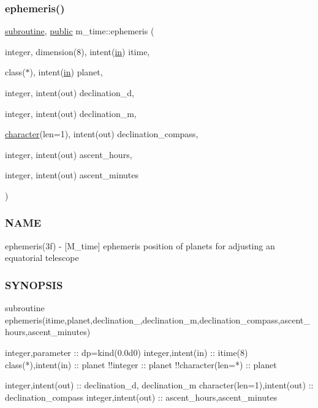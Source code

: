 \subsubsection{\texorpdfstring{ephemeris()}{ephemeris()}}
{\footnotesize\ttfamily \hyperlink{M__stopwatch_83_8txt_acfbcff50169d691ff02d4a123ed70482}{subroutine}, \hyperlink{M__stopwatch_83_8txt_a2f74811300c361e53b430611a7d1769f}{public} m\+\_\+time\+::ephemeris (\begin{DoxyParamCaption}\item[{integer, dimension(8), intent(\hyperlink{M__journal_83_8txt_afce72651d1eed785a2132bee863b2f38}{in})}]{itime,  }\item[{class($\ast$), intent(\hyperlink{M__journal_83_8txt_afce72651d1eed785a2132bee863b2f38}{in})}]{planet,  }\item[{integer, intent(out)}]{declination\+\_\+d,  }\item[{integer, intent(out)}]{declination\+\_\+m,  }\item[{\hyperlink{option__stopwatch_83_8txt_abd4b21fbbd175834027b5224bfe97e66}{character}(len=1), intent(out)}]{declination\+\_\+compass,  }\item[{integer, intent(out)}]{ascent\+\_\+hours,  }\item[{integer, intent(out)}]{ascent\+\_\+minutes }\end{DoxyParamCaption})}



\subsubsection*{N\+A\+ME}

ephemeris(3f) -\/ \mbox{[}M\+\_\+time\mbox{]} ephemeris position of planets for adjusting an equatorial telescope

\subsubsection*{S\+Y\+N\+O\+P\+S\+IS}

\begin{DoxyVerb}subroutine ephemeris(itime,planet,declination_,declination_m,declination_compass,ascent_hours,ascent_minutes)

 integer,parameter            :: dp=kind(0.0d0)
 integer,intent(in)           :: itime(8)
 class(*),intent(in)          :: planet
  !!integer                   :: planet
  !!character(len=*)          :: planet

 integer,intent(out)          :: declination_d, declination_m
 character(len=1),intent(out) :: declination_compass
 integer,intent(out)          :: ascent_hours,ascent_minutes
\end{DoxyVerb}


